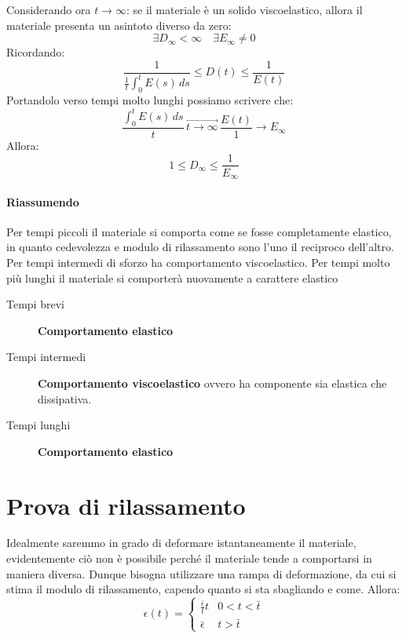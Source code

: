 Considerando ora $t \rightarrow \infty$: se il materiale è un solido viscoelastico, allora il materiale presenta un asintoto diverso da zero:
\begin{equation}
\exists D_{\infty} < \infty \quad \exists E_{\infty} \neq 0
\end{equation}
Ricordando:
\begin{equation}
\frac{1}{\frac{1}{t}\int_0^t{E(s)\,ds}} \leq D(t) \leq \frac{1}{E(t)}
\end{equation}
Portandolo verso tempi molto lunghi possiamo scrivere che:
\begin{equation}
\frac{\int_0^t{E(s)\,ds}}{t} \, \overrightarrow{t \rightarrow \infty} \, \frac{E(t)}{1}\rightarrow E_{\infty}
\end{equation}
Allora:
\begin{equation}
1 \leq D_{\infty} \leq \frac{1}{E_{\infty}}
\end{equation}

\paragraph{Riassumendo}
Per tempi piccoli il materiale si comporta come se fosse completamente elastico, in quanto cedevolezza e modulo di rilassamento sono l'uno il reciproco dell'altro.
Per tempi intermedi di sforzo ha comportamento viscoelastico.
Per tempi molto più lunghi il materiale si comporterà nuovamente a carattere elastico
\begin{description}
\item[Tempi brevi] \textbf{Comportamento elastico}
\item[Tempi intermedi] \textbf{Comportamento viscoelastico} ovvero ha componente sia elastica che dissipativa.
\item[Tempi lunghi] \textbf{Comportamento elastico}
\end{description}

\section{Prova di rilassamento}
Idealmente saremmo in grado di deformare istantaneamente il materiale, evidentemente ciò non è possibile perché il materiale tende a comportarsi in maniera diversa.
Dunque bisogna utilizzare una rampa di deformazione, da cui si stima il modulo di rilassamento, capendo quanto si sta sbagliando e come.
Allora:
\begin{equation}
\epsilon(t)=%
\begin{cases}
\frac{\bar{\epsilon}}{t}t &0<t<\bar{t}\\
\bar{\epsilon} &t>\bar{t}
\end{cases}
\label{eqn:ProvaRilassamento}
\end{equation}

